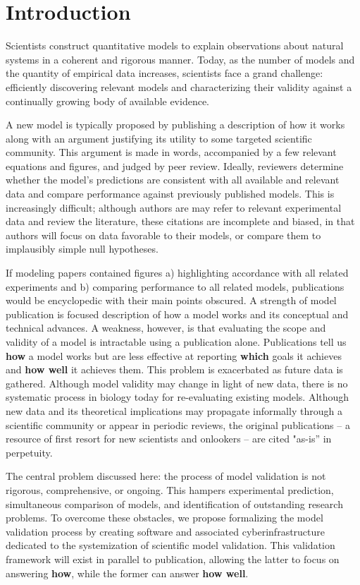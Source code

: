 \documentclass[11pt,letterpaper]{article}
\begin{document}


\section{Introduction}
Scientists construct quantitative models to explain observations about natural systems in a coherent and rigorous manner. Today, as the number of models and the quantity of empirical data increases, scientists face a grand challenge: efficiently discovering relevant models and characterizing their validity against a continually growing body of available evidence. 

A new model is typically proposed by publishing a description of how it works along with an argument justifying its utility to some targeted scientific community. This argument is made in words, accompanied by a few relevant equations and figures, and judged by peer review. Ideally, reviewers determine whether the model's predictions are consistent with all available and relevant data and compare performance against previously published models. This is increasingly difficult; although authors are may refer to relevant experimental data and review the literature, these citations are incomplete and biased, in that authors will focus on data favorable to their models, or compare them to implausibly simple null hypotheses.

If modeling papers contained figures a) highlighting accordance with all related experiments and b) comparing performance to all related models, publications would be encyclopedic with their main points obscured. A strength of model publication is focused description of how a model works and its conceptual and technical advances. A weakness, however, is that evaluating the scope and validity of a model is intractable using a publication alone. Publications tell us \textbf{how} a model works but are less effective at reporting \textbf{which} goals it achieves and \textbf{how well} it achieves them. This problem is exacerbated as future data is gathered. Although model validity may change in light of new data, there is no systematic process in biology today for re-evaluating existing models. Although new data and its theoretical implications may propagate informally through a scientific community or appear in periodic reviews, the original publications -- a resource of first resort for new scientists and onlookers -- are cited "as-is'' in perpetuity. 	

The central problem discussed here: the process of model validation is not rigorous, comprehensive, or ongoing. This hampers experimental prediction, simultaneous comparison of models, and identification of outstanding research problems. To overcome these obstacles, we propose formalizing the model validation process by creating software and associated cyberinfrastructure dedicated to the systemization of scientific model validation.  This validation framework will exist in parallel to publication, allowing the latter to focus on answering \textbf{how}, while the former can answer \textbf{how well}. 
\end{document}
